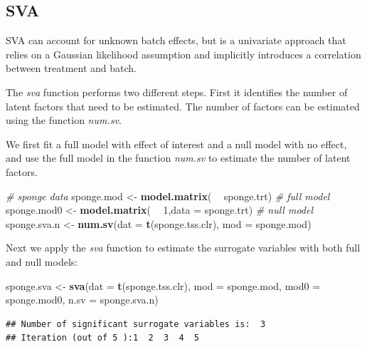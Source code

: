 \documentclass[]{book}
\newenvironment{Shaded}{\begin{snugshade}}{\end{snugshade}}
\newcommand{\KeywordTok}[1]{\textcolor[rgb]{0.13,0.29,0.53}{\textbf{#1}}}
\newcommand{\DataTypeTok}[1]{\textcolor[rgb]{0.13,0.29,0.53}{#1}}
\newcommand{\DecValTok}[1]{\textcolor[rgb]{0.00,0.00,0.81}{#1}}
\newcommand{\StringTok}[1]{\textcolor[rgb]{0.31,0.60,0.02}{#1}}
\newcommand{\CommentTok}[1]{\textcolor[rgb]{0.56,0.35,0.01}{\textit{#1}}}
\newcommand{\OperatorTok}[1]{\textcolor[rgb]{0.81,0.36,0.00}{\textbf{#1}}}
\newcommand{\NormalTok}[1]{#1}
\begin{document}
\subsection{SVA}\label{sva}

SVA can account for unknown batch effects, but is a univariate approach
that relies on a Gaussian likelihood assumption and implicitly
introduces a correlation between treatment and batch.

The \emph{sva} function performs two different steps. First it
identifies the number of latent factors that need to be estimated. The
number of factors can be estimated using the function \emph{num.sv}.

We first fit a full model with effect of interest and a null model with
no effect, and use the full model in the function \emph{num.sv} to
estimate the number of latent factors.

\begin{Shaded}
\begin{Highlighting}[]
\CommentTok{# sponge data}
\NormalTok{sponge.mod <-}\StringTok{ }\KeywordTok{model.matrix}\NormalTok{( }\OperatorTok{~}\StringTok{ }\NormalTok{sponge.trt) }\CommentTok{# full model}
\NormalTok{sponge.mod0 <-}\StringTok{ }\KeywordTok{model.matrix}\NormalTok{( }\OperatorTok{~}\StringTok{ }\DecValTok{1}\NormalTok{,}\DataTypeTok{data =}\NormalTok{ sponge.trt) }\CommentTok{# null model}
\NormalTok{sponge.sva.n <-}\StringTok{ }\KeywordTok{num.sv}\NormalTok{(}\DataTypeTok{dat =} \KeywordTok{t}\NormalTok{(sponge.tss.clr), }\DataTypeTok{mod =}\NormalTok{ sponge.mod)}
\end{Highlighting}
\end{Shaded}

Next we apply the \emph{sva} function to estimate the surrogate
variables with both full and null models:

\begin{Shaded}
\begin{Highlighting}[]
\NormalTok{sponge.sva <-}\StringTok{ }\KeywordTok{sva}\NormalTok{(}\DataTypeTok{dat =} \KeywordTok{t}\NormalTok{(sponge.tss.clr), }\DataTypeTok{mod =}\NormalTok{ sponge.mod, }
                 \DataTypeTok{mod0 =}\NormalTok{ sponge.mod0, }\DataTypeTok{n.sv =}\NormalTok{ sponge.sva.n)}
\end{Highlighting}
\end{Shaded}

\begin{verbatim}
## Number of significant surrogate variables is:  3 
## Iteration (out of 5 ):1  2  3  4  5
\end{verbatim}
\end{document}
